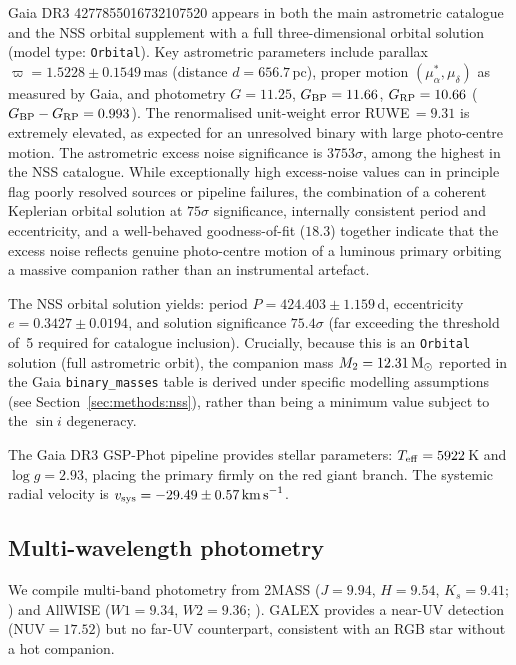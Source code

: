 \documentclass[usenatbib,fleqn]{mnras}
\newcommand{\Msun}{{\rm M}_\odot}
\newcommand{\kms}{{\rm km\,s}^{-1}}
\begin{document}
Gaia DR3 4277855016732107520 appears in both the main astrometric
catalogue and the NSS orbital supplement with a full
three-dimensional orbital solution (model type: \texttt{Orbital}).
Key astrometric parameters include parallax
$\varpi = 1.5228 \pm 0.1549$\,mas (distance $d = 656.7$\,pc),
proper motion
$(\mu_\alpha^*, \mu_\delta)$ as measured by Gaia,
and photometry $G = 11.25$, $G_{\rm BP} = 11.66$,
$G_{\rm RP} = 10.66$ ($G_{\rm BP} - G_{\rm RP} = 0.993$).
The renormalised unit-weight error RUWE$\,= 9.31$ is extremely
elevated, as expected for an unresolved binary with large
photo-centre motion.  The astrometric excess noise significance is
$3753\sigma$, among the highest in the NSS catalogue.  While
exceptionally high excess-noise values can in principle flag
poorly resolved sources or pipeline failures, the combination
of a coherent Keplerian orbital solution at $75\sigma$
significance, internally consistent period and eccentricity, and
a well-behaved goodness-of-fit ($18.3$) together indicate that
the excess noise reflects genuine photo-centre motion of a
luminous primary orbiting a massive companion rather than an
instrumental artefact.

The NSS orbital solution yields:
period $P = 424.403 \pm 1.159$\,d,
eccentricity $e = 0.3427 \pm 0.0194$,
and solution significance $75.4\sigma$ (far exceeding the
threshold of~5 required for catalogue inclusion).
Crucially, because this is an \texttt{Orbital} solution (full
astrometric orbit), the companion mass
$M_2 = 12.31\,\Msun$ reported in the Gaia
\texttt{binary\_masses} table is derived under specific modelling
assumptions (see Section~\ref{sec:methods:nss}), rather than being
a minimum value subject to the $\sin i$ degeneracy.

The Gaia DR3 GSP-Phot pipeline provides stellar parameters:
$T_{\rm eff} = 5922$\,K and $\log g = 2.93$, placing the primary
firmly on the red giant branch.  The systemic radial velocity is
$v_{\rm sys} = -29.49 \pm 0.57\,\kms$.

\subsection{Multi-wavelength photometry}
\label{sec:data:phot}

We compile multi-band photometry from 2MASS
($J = 9.94$, $H = 9.54$, $K_s = 9.41$; \citealt{Cutri2003}) and
AllWISE ($W1 = 9.34$, $W2 = 9.36$; \citealt{Cutri2014}).  GALEX
\citep{Bianchi2017} provides a near-UV detection ($\mathrm{NUV}
= 17.52$) but no far-UV counterpart, consistent with an RGB star
without a hot companion.
\end{document}

